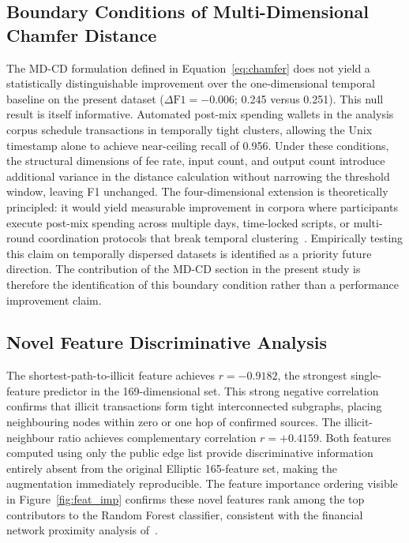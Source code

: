 \documentclass[12pt,a4paper]{article}
\begin{document}
\subsection{Boundary Conditions of Multi-Dimensional Chamfer Distance}

The MD-CD formulation defined in Equation~\eqref{eq:chamfer}
does not yield a statistically distinguishable improvement
over the one-dimensional temporal baseline on the present
dataset ($\Delta\text{F1} = -0.006$; 0.245 versus 0.251).
This null result is itself informative. Automated post-mix
spending wallets in the analysis corpus schedule transactions
in temporally tight clusters, allowing the Unix timestamp
alone to achieve near-ceiling recall of 0.956. Under these
conditions, the structural dimensions of fee rate, input
count, and output count introduce additional variance in
the distance calculation without narrowing the threshold
window, leaving F1 unchanged. The four-dimensional extension
is theoretically principled: it would yield measurable
improvement in corpora where participants execute post-mix
spending across multiple days, time-locked scripts, or
multi-round coordination protocols that break temporal
clustering~\citep{chen2025multi}. Empirically testing this
claim on temporally dispersed datasets is identified as
a priority future direction. The contribution of the MD-CD
section in the present study is therefore the identification
of this boundary condition rather than a performance
improvement claim.

\subsection{Novel Feature Discriminative Analysis}

The shortest-path-to-illicit feature achieves $r = -0.9182$,
the strongest single-feature predictor in the 169-dimensional
set. This strong negative correlation confirms that illicit
transactions form tight interconnected subgraphs, placing
neighbouring nodes within zero or one hop of confirmed
sources. The illicit-neighbour ratio achieves complementary
correlation $r = +0.4159$. Both features computed using
only the public edge list provide discriminative information
entirely absent from the original Elliptic 165-feature set,
making the augmentation immediately reproducible. The
feature importance ordering visible in Figure~\ref{fig:feat_imp}
confirms these novel features rank among the top contributors
to the Random Forest classifier, consistent with the
financial network proximity analysis of~\citet{gu2025}.
\end{document}
